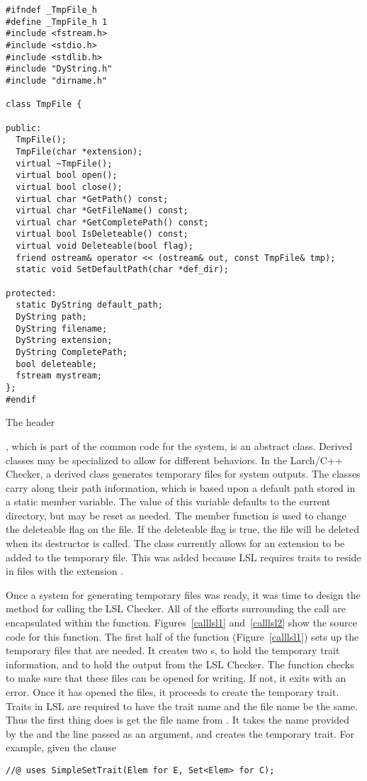 \begin{BFIGURE}
\begin{verbatim}
#ifndef _TmpFile_h
#define _TmpFile_h 1
#include <fstream.h>
#include <stdio.h>
#include <stdlib.h>
#include "DyString.h"
#include "dirname.h"

class TmpFile {

public:
  TmpFile();
  TmpFile(char *extension);
  virtual ~TmpFile();
  virtual bool open();
  virtual bool close();
  virtual char *GetPath() const;
  virtual char *GetFileName() const;
  virtual char *GetCompletePath() const;
  virtual bool IsDeleteable() const;
  virtual void Deleteable(bool flag);
  friend ostream& operator << (ostream& out, const TmpFile& tmp);
  static void SetDefaultPath(char *def_dir);

protected:
  static DyString default_path;
  DyString path;
  DyString filename;
  DyString extension;
  DyString CompletePath;
  bool deleteable;
  fstream mystream;
};
#endif
\end{verbatim}
\caption{The  header}
\label{tmpfile}
\end{BFIGURE}
, which is part of the common code for the system, is an
abstract class. Derived classes may be specialized to allow for
different behaviors. In the Larch/C++ Checker, a derived class
 generates temporary files for system outputs. The classes
carry along their path information, which is based upon a default path
stored in a static member variable. The value of this variable defaults to
the current directory, but may be reset as needed. The 
member function is used to change the deleteable flag on the file. If
the deleteable flag is true, the file will be deleted when its
destructor is called. The class currently allows for an extension to
be added to the temporary file. This was added because LSL requires
traits to reside in files with the extension
.

Once a system for generating temporary files was ready, it was time to
design the method for calling the LSL Checker. All of the efforts
surrounding the call are encapsulated within the 
function. Figures~\ref{calllsl1} and~\ref{calllsl2} show the source
code for this function. The first half of the function
(Figure~\ref{calllsl1}) sets up the temporary files that are needed. It creates
two s,  to hold the temporary trait information, and
 to hold the output from the LSL Checker. The function checks
to make sure that these files can be opened for writing. If not, it
exits with an error. Once it has opened the files, it proceeds to
create the temporary trait. Traits in LSL are required to have the
trait name and the file name be the same. Thus the first thing
 does is get the file name from
. It takes the name provided by the
 and the  line 
passed as an argument, and creates the temporary trait. For example,
given the  clause
\begin{verbatim}
//@ uses SimpleSetTrait(Elem for E, Set<Elem> for C);
\end{verbatim}

